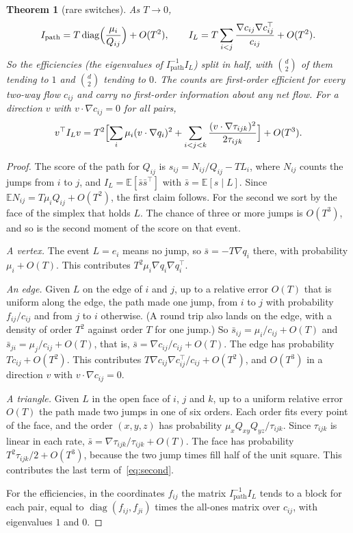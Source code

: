 \documentclass[11pt]{article}
\newtheorem{theorem}{Theorem}[section]
\theoremstyle{definition}
\theoremstyle{remark}
\newcommand{\E}{\mathbb E}
\begin{document}
\begin{theorem}[rare switches]\label{thm:info}
As $T\to0$,
\[
I_{\mathrm{path}}=T\operatorname{diag}\Bigl(\frac{\mu_i}{Q_{ij}}\Bigr)+O(T^2),
\qquad
I_L=T\sum_{i<j}\frac{\nabla c_{ij}\nabla c_{ij}^{\top}}{c_{ij}}+O(T^2).
\]
So the efficiencies (the eigenvalues of $I_{\mathrm{path}}^{-1}I_L$) split in
half, with $\binom d2$ of them tending to $1$ and $\binom d2$ tending to $0$. The
counts are first-order efficient for every two-way flow $c_{ij}$ and carry no
first-order information about any net flow. For a direction $v$ with
$v\cdot\nabla c_{ij}=0$ for all pairs,
\begin{equation}\label{eq:second}
v^{\top}I_Lv=T^2\Bigl[\sum_i\mu_i(v\cdot\nabla q_i)^2
+\sum_{i<j<k}\frac{(v\cdot\nabla\tau_{ijk})^2}{2\tau_{ijk}}\Bigr]+O(T^3).
\end{equation}
\end{theorem}
\begin{proof}
The score of the path for $Q_{ij}$ is $s_{ij}=N_{ij}/Q_{ij}-TL_i$, where $N_{ij}$
counts the jumps from $i$ to $j$, and $I_L=\E[\bar s\bar s^{\top}]$ with
$\bar s=\E[s\mid L]$. Since $\E N_{ij}=T\mu_iQ_{ij}+O(T^2)$, the first claim
follows. For the second we sort by the face of the simplex that holds $L$. The
chance of three or more jumps is $O(T^3)$, and so is the second moment of the
score on that event.

\emph{A vertex.} The event $L=e_i$ means no jump, so $\bar s=-T\nabla q_i$ there, with
probability $\mu_i+O(T)$. This contributes $T^2\mu_i\nabla q_i\nabla q_i^{\top}$.

\emph{An edge.} Given $L$ on the edge of $i$ and $j$, up to a relative error
$O(T)$ that is uniform along the edge, the path made one jump, from $i$ to $j$
with probability $f_{ij}/c_{ij}$ and from $j$ to $i$ otherwise. (A round trip
also lands on the edge, with a density of order $T^2$ against order $T$ for one
jump.) So
$\bar s_{ij}=\mu_i/c_{ij}+O(T)$ and $\bar s_{ji}=\mu_j/c_{ij}+O(T)$, that is,
$\bar s=\nabla c_{ij}/c_{ij}+O(T)$. The edge has probability $Tc_{ij}+O(T^2)$.
This contributes $T\nabla c_{ij}\nabla c_{ij}^{\top}/c_{ij}+O(T^2)$, and
$O(T^3)$ in a direction $v$ with $v\cdot\nabla c_{ij}=0$.

\emph{A triangle.} Given $L$ in the open face of $i$, $j$ and $k$, up to a
uniform relative error $O(T)$ the path made two jumps in one of six orders. Each
order fits every point of the face, and the order $(x,y,z)$ has probability
$\mu_xQ_{xy}Q_{yz}/\tau_{ijk}$. Since $\tau_{ijk}$ is linear in each rate,
$\bar s=\nabla\tau_{ijk}/\tau_{ijk}+O(T)$. The face has probability
$T^2\tau_{ijk}/2+O(T^3)$, because the two jump times fill half of the unit
square. This contributes the last term of~\eqref{eq:second}.

For the efficiencies, in the coordinates $f_{ij}$ the matrix
$I_{\mathrm{path}}^{-1}I_L$ tends to a block for each pair, equal to
$\operatorname{diag}(f_{ij},f_{ji})$ times the all-ones matrix over $c_{ij}$,
with eigenvalues $1$ and $0$.
\end{proof}
\end{document}
